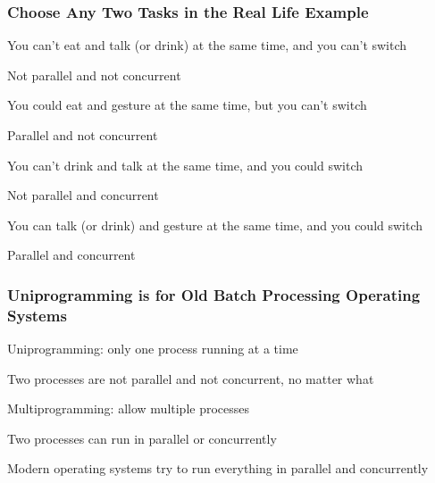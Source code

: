   \begin{frame}
    \frametitle{Choose Any Two Tasks in the Real Life Example}

    You can't eat and talk (or drink) at the same time, and you can't switch

    \hspace{2em} Not parallel and not concurrent

    \vspace{2em}

    You could eat and gesture at the same time, but you can't switch

    \hspace{2em} Parallel and not concurrent

    \vspace{2em}

    You can't drink and talk at the same time, and you could switch

    \hspace{2em} Not parallel and concurrent

    \vspace{2em}

    You can talk (or drink) and gesture at the same time, and you could switch

    \hspace{2em} Parallel and concurrent
  \end{frame}


  \begin{frame}
    \frametitle{Uniprogramming is for Old Batch Processing Operating Systems}

    Uniprogramming: only one process running at a time

    \hspace{2em} Two processes are not parallel and not concurrent, no matter what

    \vspace{2em}

    Multiprogramming: allow multiple processes

    \hspace{2em} Two processes can run in parallel or concurrently

    \vspace{4em}

    Modern operating systems try to run everything in parallel and concurrently
  \end{frame}

